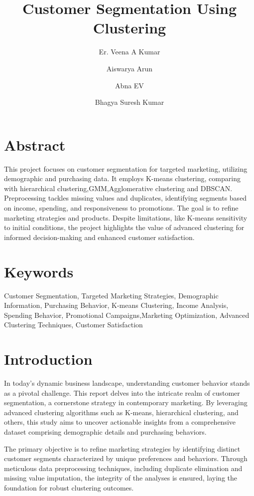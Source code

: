 \documentclass{josis}
\begin{document}


\title{Customer Segmentation Using Clustering}

\author{Er. Veena A Kumar}
\author{Aiswarya Arun}
\author{Abna EV}
\author{Bhagya Suresh Kumar}
\date{}
\maketitle
\section{Abstract}
This project focuses on customer segmentation for targeted marketing, utilizing demographic and purchasing data. It employs K-means clustering, comparing with hierarchical clustering,GMM,Agglomerative clustering and DBSCAN. Preprocessing tackles missing values and duplicates, identifying segments based on income, spending, and responsiveness to promotions. The goal is to refine marketing strategies and products. Despite limitations, like K-means sensitivity to initial conditions, the project highlights the value of advanced clustering for informed decision-making and enhanced customer satisfaction.

\section{Keywords}Customer Segmentation, Targeted Marketing Strategies, Demographic Information, Purchasing Behavior, K-means Clustering, Income Analysis, Spending Behavior, Promotional Campaigns,Marketing Optimization, Advanced Clustering Techniques, Customer Satisfaction
\section{Introduction}
In today's dynamic business landscape, understanding customer behavior stands as a pivotal challenge. This report delves into the intricate realm of customer segmentation, a cornerstone strategy in contemporary marketing. By leveraging advanced clustering algorithms such as K-means, hierarchical clustering, and others, this study aims to uncover actionable insights from a comprehensive dataset comprising demographic details and purchasing behaviors.

The primary objective is to refine marketing strategies by identifying distinct customer segments characterized by unique preferences and behaviors. Through meticulous data preprocessing techniques, including duplicate elimination and missing value imputation, the integrity of the analyses is ensured, laying the foundation for robust clustering outcomes.
\end{document}
